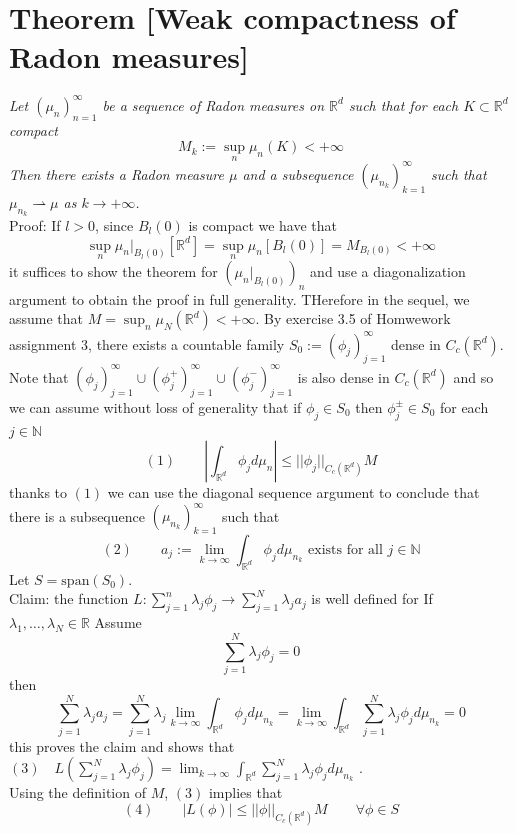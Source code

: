 \documentclass[11pt]{article}
\begin{document}
\section{Theorem [Weak compactness of Radon measures]}
\emph{
Let $(\mu_n)_{n=1}^{\infty}$ be a sequence of Radon measures on $ \mathbb{R}^{d}$ such that for each $ K \subset \mathbb{R}^{d}$ compact
\[
    M_k := \sup_{n} \mu_n(K) < +\infty
\] 
Then there exists a Radon measure $\mu$ and a subsequence $(\mu_{n_k})_{k=1}^{\infty}$ such that $\mu_{n_k} \rightharpoonup \mu$ as $k \rightarrow +\infty$.
}\\
Proof: If $l > 0$, since  $B_l(0)$ is compact we have that
 \[
     \sup_n \mu_n|_{B_l(0)}[ \mathbb{R}^{d}] = \sup_n \mu_n[B_l(0)] = M_{B_l(0)} < +\infty
\] 
it suffices to show the theorem for $\left(\mu_n|_{B_l(0)}\right)_n$ and use a diagonalization argument
to obtain the proof in full generality. THerefore in the sequel, we assume that $M = \sup_{n} \mu_N( \mathbb{R}^{d}) < +\infty$.
By exercise 3.5 of Homwework assignment 3, there exists a countable family $S_0 := (\phi_j)_{j=1}^{\infty}$ dense in $C_c( \mathbb{R}^{d})$. Note that
$ (\phi_j)_{j=1}^{\infty} \cup (\phi_j^{+})_{j=1}^{\infty} \cup (\phi_j^{-})_{j=1}^{\infty}$ is also dense in $ C_c( \mathbb{R}^{d})$ and so we can assume without loss of generality that if $\phi_j \in S_0$
then $\phi_j^{\pm} \in S_0$ for each $j \in \mathbb{N}$
\[
    (1)   \qquad  \left | \int_{ \mathbb{R}^{d}}^{} \phi_j d \mu_n \right | \le  || \phi_j ||_{C_c( \mathbb{R}^{d})}M
\] 
thanks to $(1)$ we can use the diagonal sequence argument to conclude that there is a subsequence  $(\mu_{n_k})_{k=1}^{\infty}$ such that
\[
    (2) \qquad a_j := \lim_{k\to \infty} \int_{ \mathbb{R}^{d} }^{} \phi_j d \mu_{n_k}   \text{ exists for all $j \in \mathbb{N}$}
\] 
Let $S = \text{span}(S_0)$.\\
Claim: the function $L : \sum_{j=1}^{n}\lambda_j \phi_j \rightarrow \sum_{j=1}^{N}\lambda_j a_j$ is well defined for 
If $\lambda_1,\dots,\lambda_N \in \mathbb{R}$ 
Assume
\[
\sum_{j=1}^{N}\lambda_j \phi_j = 0
\] 
then
\[
    \sum_{j=1}^{N}\lambda_j a_j = \sum_{j=1}^{N}\lambda_j \lim_{k\to \infty} \int_{ \mathbb{R}^{d}}^{}\phi_j d \mu_{n_k} = \lim_{k\to \infty}\int_{ \mathbb{R}^{d}}^{} \sum_{j=1}^{N}\lambda_j \phi_j d \mu_{n_k} = 0
\] 
this proves the claim and shows that $(3) \quad L( \sum_{j=1}^{N}\lambda_j \phi_j) = \lim_{k\to \infty} \int_{ \mathbb{R}^{d}}^{}\sum_{j=1}^{N}\lambda_j \phi_j d \mu_{n_k}$ .\\
Using the definition of $M$, $(3)$ implies that
 \[
     (4) \qquad |L(\phi)| \le ||\phi||_{C_c( \mathbb{R}^{d})} M \qquad \forall \phi \in S
\] 
\end{document}
